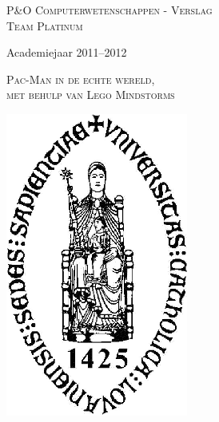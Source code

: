
\begin{titlepage}

\fontsize{12pt}{14pt}\selectfont

\begin{center}

\vspace{1cm}

\fontsize{14pt}{17pt}\selectfont
\textsc{P\&O Computerwetenschappen - Verslag \\Team Platinum}
\fontsize{12pt}{14pt}\selectfont
\vspace{0.3cm}

\vspace{1.2cm}

Academiejaar 2011--2012

\vspace{2.8cm}

\fontsize{17.28pt}{21pt}\selectfont

{\textsc{Pac-Man in de echte wereld,\\ met behulp van Lego Mindstorms}}

\fontsize{12pt}{14pt}\selectfont

\vspace{2cm}

\includegraphics[height=10cm]{resources/Logo-Kul}

\end{center}
\end{titlepage}

\thispagestyle{empty}
